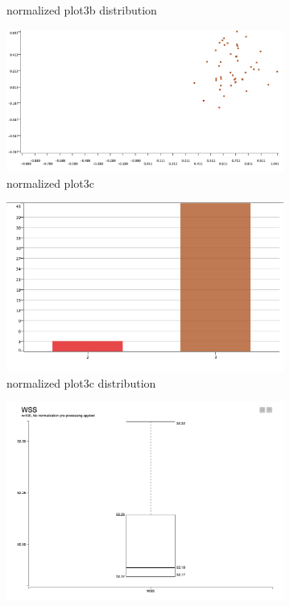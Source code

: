 \documentclass[11pt]{article}
\begin{document}
\begin{figure}[H]
\begin{subfigure}{0.3\textwidth}
					\caption{normalized plot3b distribution}
					\label{fig:second}
				\end{subfigure}
				\hfill
				\begin{subfigure}{0.3\textwidth}
					\includegraphics[width=\textwidth]{res/t2/t24/t24-plot23c}
					\caption{normalized plot3c}
					\label{fig:first}
				\end{subfigure}
				\hfill
				\begin{subfigure}{0.3\textwidth}
					\includegraphics[width=\textwidth]{res/t2/t24/t24-plot23c-dist}
					\caption{normalized plot3c distribution}
					\label{fig:second}
				\end{subfigure}
				\hfill
				\begin{subfigure}{0.3\textwidth}
					\includegraphics[width=\textwidth]{res/t2/t24/t24-WSS-plot}

\end{subfigure}
\end{figure}
\end{document}

